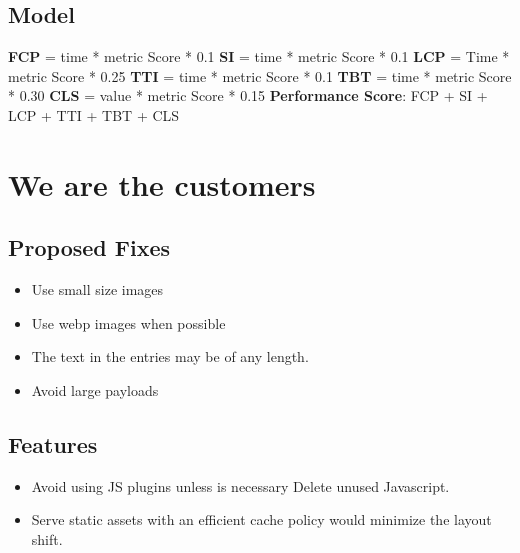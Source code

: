 \subsection{Model}
\textbf{FCP} = time * metric Score * 0.1 \newline
\textbf{SI} = time * metric Score * 0.1 \newline
\textbf{LCP} = Time * metric Score * 0.25 \newline
\textbf{TTI} = time * metric Score * 0.1 \newline
\textbf{TBT} = time * metric Score * 0.30 \newline
\textbf{CLS} = value * metric Score * 0.15\newline\newline
\textbf{Performance Score}: FCP + SI + LCP + TTI + TBT + CLS

\pagebreak

\section{We are the customers}
\subsection{Proposed Fixes}
\begin{itemize}
    \item Use small size images
    \item Use webp images when possible
    \item The text in the entries may be of any length.
    \item Avoid large payloads
  \end{itemize}
\subsection{Features}
\begin{itemize}
    \item Avoid using JS plugins unless is necessary Delete unused Javascript.
    \item Serve static assets with an efficient cache policy would minimize the layout shift.
\end{itemize}

\pagebreak

